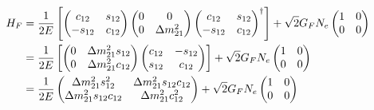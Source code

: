 \begin{align}
    H_F
        &= \frac{1}{2E}\left[
            \begin{pmatrix}
                c_{12} & s_{12} \\ 
                -s_{12} & c_{12} \\ 
            \end{pmatrix}  
            \begin{pmatrix}
            0 & 0 \\
            0 & \dm_{21}
        \end{pmatrix} 
        \begin{pmatrix}
            c_{12} & s_{12}\\ 
            -s_{12} & c_{12} \end{pmatrix}^\dagger \right] + \sqrt{2}G_F N_e 
            \begin{pmatrix}
            1 & 0 \\
            0 & 0 \\
        \end{pmatrix} \nonumber \\
        &= 
        \frac{1}{2E}\left[
            \begin{pmatrix}
                0 & \dm_{21} s_{12} \\ 
                0 & \dm_{21} c_{12} \\ 
            \end{pmatrix}  
        \begin{pmatrix}
            c_{12} & -s_{12}\\ 
            s_{12} & c_{12} \end{pmatrix} \right] + \sqrt{2}G_F N_e 
            \begin{pmatrix}
            1 & 0 \\
            0 & 0 \\
        \end{pmatrix} \nonumber \\
        &= 
        \frac{1}{2E}
            \begin{pmatrix}
                \dm_{21} s_{12}^2 & \dm_{21} s_{12}c_{12} \\ 
                \dm_{21} s_{12}c_{12} & \dm_{21} c_{12}^2 \\ 
            \end{pmatrix} + \sqrt{2}G_F N_e 
            \begin{pmatrix}
            1 & 0 \\
            0 & 0 \\

\end{pmatrix}
\end{align}
